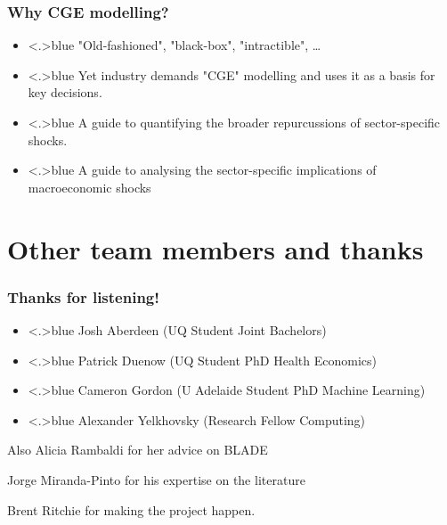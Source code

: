 \documentclass[handout,english]{beamer}
\begin{document}
\begin{frame}
  \frametitle{Why CGE modelling?}

  \begin{itemize}
    \item<+-|alert@+>{\color<.>{blue}
      "Old-fashioned", "black-box", "intractible", \dots
    }
    \item<+-|alert@+>{\color<.>{blue}
      Yet industry demands "CGE" modelling and uses it as a basis for key 
      decisions.
    }
    \item<+-|alert@+>{\color<.>{blue}
      A guide to quantifying the broader repurcussions of sector-specific
      shocks.
    }
    \item<+-|alert@+>{\color<.>{blue}
      A guide to analysing the sector-specific implications of macroeconomic shocks
    }
  \end{itemize}
\vfill
\end{frame}
\section{Other team members and thanks}
\begin{frame}
  \frametitle{Thanks for listening!}

\begin{itemize}
\item<+-|alert@+>{\color<.>{blue}
        Josh Aberdeen (UQ Student Joint Bachelors)}
\item<+-|alert@+>{\color<.>{blue}
        Patrick Duenow (UQ Student PhD Health Economics)
        }
\item<+-|alert@+>{\color<.>{blue}
        Cameron Gordon (U Adelaide Student PhD Machine Learning)
        }
\item<+-|alert@+>{\color<.>{blue}
    Alexander Yelkhovsky (Research Fellow Computing)
  }
\end{itemize}
Also Alicia Rambaldi for her advice on BLADE

Jorge Miranda-Pinto for his expertise on the literature

Brent Ritchie for making the project happen.

\vfill\end{frame}
\end{document}
